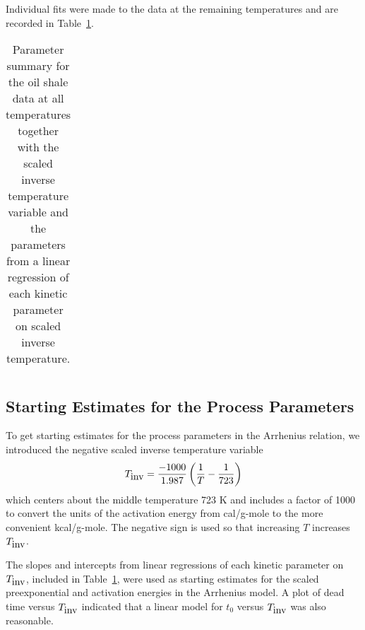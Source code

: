 Individual fits were made to the data at the remaining temperatures
and are recorded in
Table~\ref{tbl:alltemp}.
\begin{table}
  \caption{\label{tbl:alltemp}
  Parameter summary for the oil shale data at all temperatures together
  with the scaled inverse temperature variable and the parameters
  from a linear regression of each kinetic parameter on scaled inverse
  temperature.
  }
  \begin{tabular}{l r r r r r}
  \end{tabular}
\end{table}

\subsection{Starting Estimates for the Process Parameters}

To get starting estimates for the process parameters in the
Arrhenius relation, we introduced the negative scaled inverse
temperature variable
$$
T_{\mbox{\rm inv} } = {-1000  \over 1.987 }\left( {1 \over T}-{1\over 723}\right)
$$
which centers about the middle temperature 723 K and
includes a factor of 1000 to convert
the units of the activation energy from cal/g-mole to the more
convenient kcal/g-mole.
The negative sign is used so that increasing $T$ increases
$T_{\mbox{\rm inv}}$.

The slopes and intercepts from linear regressions of each
kinetic parameter on $T_{\mbox{\rm inv}}$, included in Table~\ref{tbl:alltemp},
were used as starting estimates for the scaled
preexponential and activation energies in the Arrhenius model.
A plot of dead time versus $T_{\mbox{\rm inv}}$ indicated that a linear
model for $t_{0}$ versus $T_{\mbox{\rm inv}}$ was also reasonable.

